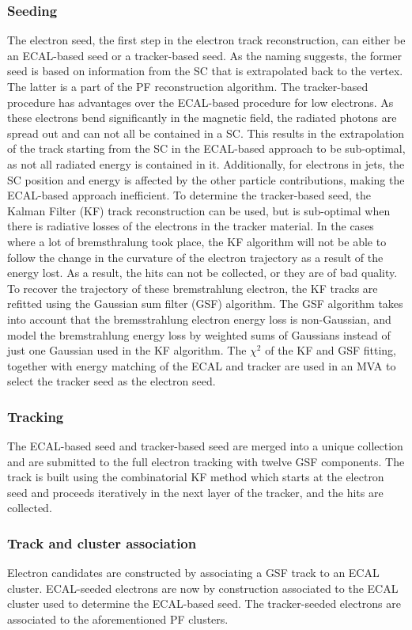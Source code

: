 \subsubsection*{Seeding}
\noindent\justify
The electron seed, the first step in the electron track reconstruction, can either be an ECAL-based seed or a tracker-based seed. 
As the naming suggests, the former seed is based on information from the SC that is extrapolated back to the vertex. 
The latter is a part of the PF reconstruction algorithm. 
The tracker-based procedure has advantages over the ECAL-based procedure for low \pt electrons. 
As these electrons bend significantly in the magnetic field, the radiated photons are spread out and can not all be contained in a SC. 
This results in the extrapolation of the track starting from the SC in the ECAL-based approach to be sub-optimal, as not all radiated energy is contained in it. 
Additionally, for electrons in jets, the SC position and energy is affected by the other particle contributions, making the ECAL-based approach inefficient. 
To determine the tracker-based seed, the Kalman Filter (KF) track reconstruction can be used, but is sub-optimal when there is radiative losses of the electrons in the tracker material. 
In the cases where a lot of bremsthralung took place, the KF algorithm will not be able to follow the change in the curvature of the electron trajectory as a result of the energy lost. 
As a result, the hits can not be collected, or they are of bad quality. 
To recover the trajectory of these bremstrahlung electron, the KF tracks are refitted using the Gaussian sum filter (GSF) algorithm.
The GSF algorithm takes into account that the bremsstrahlung electron energy loss is non-Gaussian, and model the bremstrahlung energy loss by weighted sums of Gaussians instead of just one Gaussian used in the KF algorithm. 
The $\chi^{2}$ of the KF and GSF fitting, together with energy matching of the ECAL and tracker are used in an MVA to select the tracker seed as the electron seed. 
\subsubsection*{Tracking}
\noindent\justify
The ECAL-based seed and tracker-based seed are merged into a unique collection and are submitted to the full electron tracking with twelve GSF components.
The track is built using the combinatorial KF method which starts at the electron seed and proceeds iteratively in the next layer of the tracker, and the hits are collected.
\subsubsection*{Track and cluster association}
\noindent\justify
Electron candidates are constructed by associating a GSF track to an ECAL cluster. 
ECAL-seeded electrons are now by construction associated to the ECAL cluster used to determine the ECAL-based seed. 
The tracker-seeded electrons are associated to the aforementioned PF clusters.   
